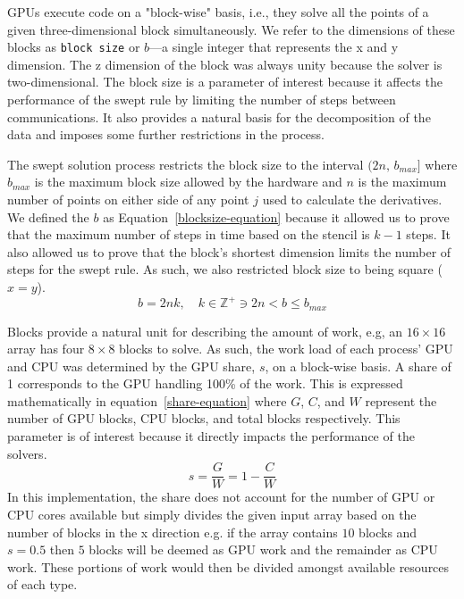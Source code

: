 \documentclass[review]{elsarticle}
\begin{document}
GPUs execute code on a "block-wise" basis, i.e., they solve all the points of a given three-dimensional block simultaneously. We refer to the dimensions of these blocks as \texttt{block size} or $b$---a single integer that represents the x and y dimension. The z dimension of the block was always unity because the solver is two-dimensional. The block size is a parameter of interest because it affects the performance of the swept rule by limiting the number of steps between communications. It also provides a natural basis for the decomposition of the data and imposes some further restrictions in the process.

\par 
The swept solution process restricts the block size to the interval $(2n,\,b_{max}]$ where $b_{max}$ is the maximum block size allowed by the hardware and $n$ is the maximum number of points on either side of any point $j$ used to calculate the derivatives. We defined the $b$ as Equation~\ref{blocksize-equation} because it allowed us to prove that the maximum number of steps in time based on the stencil is $k-1$ steps. It also allowed us to prove that the block's shortest dimension limits the number of steps for the swept rule. As such, we also restricted block size to being square ($x=y$).
\begin{equation}
    \label{blocksize-equation}
    b  = 2nk,\quad k\in\mathbb{Z}^{+}\ni 2n < b \leq b_{max}
\end{equation}

\par
Blocks provide a natural unit for describing the amount of work, e.g, an $16\times16$ array has four $8\times8$ blocks to solve. As such, the work load of each process' GPU and CPU was determined by the GPU share, $s$, on a block-wise basis. A share of 1 corresponds to the GPU handling 100\% of the work. This is expressed mathematically in equation~\ref{share-equation} where $G$, $C$, and $W$ represent the number of GPU blocks, CPU blocks, and total blocks respectively. This parameter is of interest because it directly impacts the performance of the solvers.
\begin{equation}
    \label{share-equation}
    s = \frac{G}{W} = 1-\frac{C}{W}
\end{equation}
In this implementation, the share does not account for the number of GPU or CPU cores available but simply divides the given input array based on the number of blocks in the x direction e.g. if the array contains $10$ blocks and $s=0.5$ then $5$ blocks will be deemed as GPU work and the remainder as CPU work. These portions of work would then be divided amongst available resources of each type. 
\end{document}
